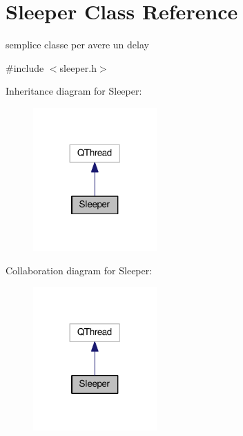 \hypertarget{classSleeper}{}\section{Sleeper Class Reference}
\label{classSleeper}


semplice classe per avere un delay  




{\ttfamily \#include $<$sleeper.\+h$>$}



Inheritance diagram for Sleeper\+:
\nopagebreak
\begin{figure}[H]
\begin{center}
\leavevmode
\includegraphics[width=134pt]{classSleeper__inherit__graph}
\end{center}
\end{figure}


Collaboration diagram for Sleeper\+:
\nopagebreak
\begin{figure}[H]
\begin{center}
\leavevmode
\includegraphics[width=134pt]{classSleeper__coll__graph}
\end{center}
\end{figure}
